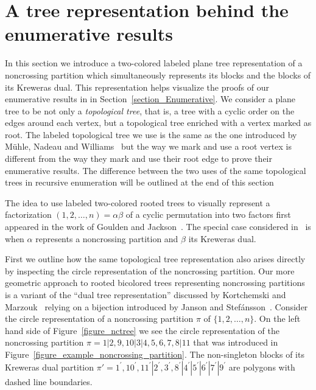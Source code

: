 \documentclass[11pt]{amsart}
\numberwithin{equation}{section}
\begin{document}
\section{A tree representation behind the enumerative results}
\label{section_A_tree_representation_of_noncrossing_partitions}

In this section we introduce a two-colored labeled plane tree 
representation of a noncrossing partition which simultaneously
represents its blocks and the blocks of its
Kreweras dual. This representation helps visualize the proofs of our
enumerative results in in Section~\ref{section_Enumerative}. We consider
a plane tree to be not only a {\em topological tree}, that is, a tree
with a cyclic order on the edges around each vertex, but a topological
tree enriched with a vertex marked as root. The labeled topological tree
we use is the same as the one introduced by M\"uhle, Nadeau and
Williams~\cite[Figure~3]{Muhle_Nadeau_Williams} but the way we mark and
use a root vertex is different from the way they mark and use their root
edge to prove their enumerative results. The difference between the two
uses of the same topological trees in recursive enumeration will be
outlined at the end of this section

The idea to use labeled two-colored rooted trees to visually 
represent a factorization $(1,2,\ldots,n)=\alpha\beta$ of a cyclic
permutation into two factors first appeared in the work of Goulden and
Jackson~\cite[Theorem~2.1]{Goulden_Jackson}. The special case considered
in~\cite[Figure~3]{Muhle_Nadeau_Williams} is when $\alpha$ represents a
noncrossing partition and $\beta$ its Kreweras dual.

First we outline how the same topological tree representation also arises
directly by inspecting the circle representation of the noncrossing
partition. Our more geometric approach to rooted bicolored trees representing
noncrossing partitions is a variant of the 
``dual tree representation'' discussed by Kortchemski and
Marzouk~\cite[Section 2]{Kortchemski_Marzouk} relying on a bijection
introduced by Janson and Stef\'ansson~\cite{Janson_Stefansson}. 
Consider the circle representation of a noncrossing partition $\pi$ of
$\{1,2,\ldots,n\}$. On the left hand side 
of Figure~\ref{figure_nctree} we see the circle representation of the
noncrossing partition $\pi=1|2,9,10|3|4,5,6,7,8|11$ that was introduced in
Figure~\ref{figure_example_noncrossing_partition}. The non-singleton
blocks of its Kreweras dual
partition $\pi'=1^{\prime},10^{\prime},11^{\prime}|2^{\prime},3^{\prime},8^{\prime}|4^{\prime}|5^{\prime}|6^{\prime}|7^{\prime}|9^{\prime}$
are polygons with dashed line boundaries.
\end{document}
